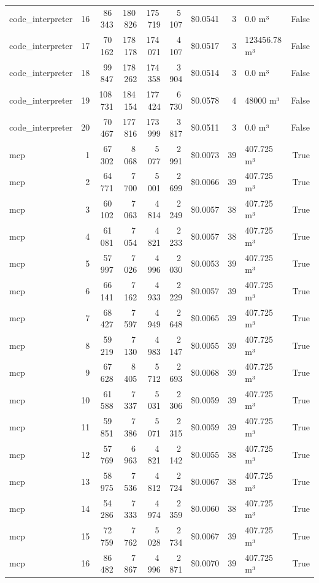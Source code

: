 \documentclass[a4paper,11pt]{article}
\begin{document}
\begin{table}[H]
{\begin{tabular}{l r r r r r r r l r}
code\_interpreter & 16 & 86\,343 & 180\,826 & 175\,719 & 5\,107 & \$0.0541 & 3 & 0.0 m³ & False \\
code\_interpreter & 17 & 70\,162 & 178\,178 & 174\,071 & 4\,107 & \$0.0517 & 3 & 123456.78 m³ & False \\
code\_interpreter & 18 & 99\,847 & 178\,262 & 174\,358 & 3\,904 & \$0.0514 & 3 & 0.0 m³ & False \\
code\_interpreter & 19 & 108\,731 & 184\,154 & 177\,424 & 6\,730 & \$0.0578 & 4 & 48000 m³ & False \\
code\_interpreter & 20 & 70\,467 & 177\,816 & 173\,999 & 3\,817 & \$0.0511 & 3 & 0.0 m³ & False \\
\midrule
mcp & 1 & 67\,302 & 8\,068 & 5\,077 & 2\,991 & \$0.0073 & 39 & 407.725 m³ & True \\
mcp & 2 & 64\,771 & 7\,700 & 5\,001 & 2\,699 & \$0.0066 & 39 & 407.725 m³ & True \\
mcp & 3 & 60\,102 & 7\,063 & 4\,814 & 2\,249 & \$0.0057 & 38 & 407.725 m³ & True \\
mcp & 4 & 61\,081 & 7\,054 & 4\,821 & 2\,233 & \$0.0057 & 38 & 407.725 m³ & True \\
mcp & 5 & 57\,997 & 7\,026 & 4\,996 & 2\,030 & \$0.0053 & 39 & 407.725 m³ & True \\
mcp & 6 & 66\,141 & 7\,162 & 4\,933 & 2\,229 & \$0.0057 & 39 & 407.725 m³ & True \\
mcp & 7 & 68\,427 & 7\,597 & 4\,949 & 2\,648 & \$0.0065 & 39 & 407.725 m³ & True \\
mcp & 8 & 59\,219 & 7\,130 & 4\,983 & 2\,147 & \$0.0055 & 39 & 407.725 m³ & True \\
mcp & 9 & 67\,628 & 8\,405 & 5\,712 & 2\,693 & \$0.0068 & 39 & 407.725 m³ & True \\
mcp & 10 & 61\,588 & 7\,337 & 5\,031 & 2\,306 & \$0.0059 & 39 & 407.725 m³ & True \\
mcp & 11 & 59\,851 & 7\,386 & 5\,071 & 2\,315 & \$0.0059 & 39 & 407.725 m³ & True \\
mcp & 12 & 57\,769 & 6\,963 & 4\,821 & 2\,142 & \$0.0055 & 38 & 407.725 m³ & True \\
mcp & 13 & 58\,975 & 7\,536 & 4\,812 & 2\,724 & \$0.0067 & 38 & 407.725 m³ & True \\
mcp & 14 & 54\,286 & 7\,333 & 4\,974 & 2\,359 & \$0.0060 & 38 & 407.725 m³ & True \\
mcp & 15 & 72\,759 & 7\,762 & 5\,028 & 2\,734 & \$0.0067 & 39 & 407.725 m³ & True \\
mcp & 16 & 86\,482 & 7\,867 & 4\,996 & 2\,871 & \$0.0070 & 39 & 407.725 m³ & True \\

\end{tabular}}
\end{table}
\end{document}

